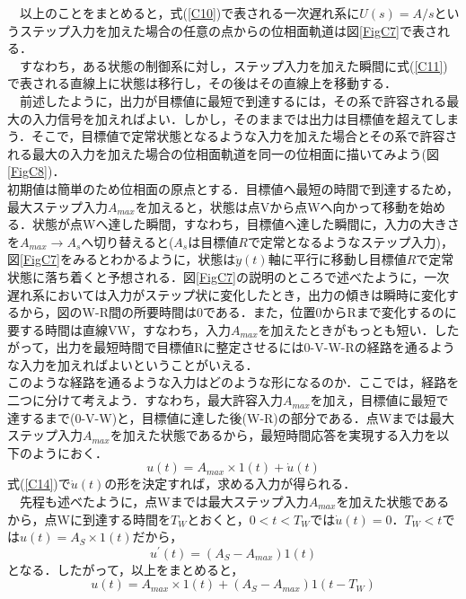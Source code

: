 \documentclass[12pt]{jsarticle}
\begin{document}
　以上のことをまとめると，式(\ref{C10})で表される一次遅れ系に$U(s)=A/s$というステップ入力を加えた場合の任意の点からの位相面軌道は図\ref{FigC7}で表される．\\
　すなわち，ある状態の制御系に対し，ステップ入力を加えた瞬間に式(\ref{C11})で表される直線上に状態は移行し，その後はその直線上を移動する．\\
　前述したように，出力が目標値に最短で到達するには，その系で許容される最大の入力信号を加えればよい．しかし，そのままでは出力は目標値を超えてしまう．そこで，目標値で定常状態となるような入力を加えた場合とその系で許容される最大の入力を加えた場合の位相面軌道を同一の位相面に描いてみよう(図\ref{FigC8})．\\
  初期値は簡単のため位相面の原点とする．目標値へ最短の時間で到達するため，最大ステップ入力$A_{max}$を加えると，状態は点Vから点Wへ向かって移動を始める．状態が点Wへ達した瞬間，すなわち，目標値へ達した瞬間に，入力の大きさを$A_{max}→ A_{s}$へ切り替えると($A_s$は目標値$R$で定常となるようなステップ入力)，図\ref{FigC7}をみるとわかるように，状態は$\dot{y}(t)$軸に平行に移動し目標値$R$で定常状態に落ち着くと予想される．図\ref{FigC7}の説明のところで述べたように，一次遅れ系においては入力がステップ状に変化したとき，出力の傾きは瞬時に変化するから，図のW-R間の所要時間は0である．また，位置0からRまで変化するのに要する時間は直線VW，すなわち，入力$A_{max}$を加えたときがもっとも短い．したがって，出力を最短時間で目標値Rに整定させるには0-V-W-Rの経路を通るような入力を加えればよいということがいえる．\\
  このような経路を通るような入力はどのような形になるのか．ここでは，経路を二つに分けて考えよう．すなわち，最大許容入力$A_{max}$を加え，目標値に最短で達するまで(0-V-W)と，目標値に達した後(W-R)の部分である．点Wまでは最大ステップ入力$A_{max}$を加えた状態であるから，最短時間応答を実現する入力を以下のようにおく．\\
\begin{equation}
  \label{C14}
  u(t)=A_{max}×1(t) + \dot{u}(t)
\end{equation}
式(\ref{C14})で$\dot{u}(t)$の形を決定すれば，求める入力が得られる．\\
　先程も述べたように，点Wまでは最大ステップ入力$A_{max}$を加えた状態であるから，点Wに到達する時間を$T_W$とおくと，$0<t<T_W$では$\dot{u}(t)=0$．$T_W<t$では$u(t)=A_S×1(t)$だから，
\begin{equation}
  \label{C15}
  u^{\prime}(t)=(A_S-A_{max})1(t)
\end{equation}
となる．したがって，以上をまとめると，
\begin{equation}
  \label{C16}
  u(t)=A_{max}×1(t)+(A_S-A_{max})1(t-T_W)
\end{equation}
\end{document}
